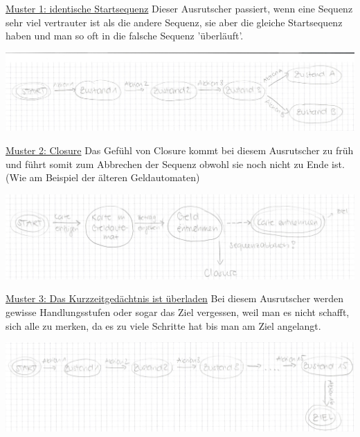 \underline{Muster 1: identische Startsequenz}
Dieser Ausrutscher passiert, wenn eine Sequenz sehr 
viel vertrauter ist als die andere Sequenz, sie aber 
die gleiche Startsequenz haben und man so oft in die 
falsche Sequenz 'überläuft'.

\includegraphics[scale=.5]{images/Muster1.jpeg}

\underline{Muster 2: Closure}
Das Gefühl von Closure kommt bei diesem Ausrutscher zu 
früh und führt somit zum Abbrechen der Sequenz obwohl 
sie noch nicht zu Ende ist. (Wie am Beispiel der älteren 
Geldautomaten)

\includegraphics[scale=.5]{images/Muster2.jpeg}

\underline{Muster 3: Das Kurzzeitgedächtnis ist überladen}
Bei diesem Ausrutscher werden gewisse Handlungsstufen 
oder sogar das Ziel vergessen, weil man es nicht schafft, 
sich alle zu merken, da es zu viele Schritte hat bis man am 
Ziel angelangt.

\includegraphics[scale=.5]{images/Muster3.jpeg}